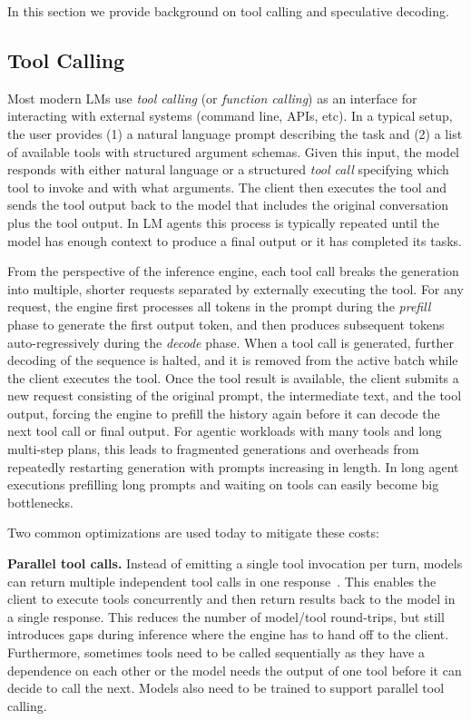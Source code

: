 


In this section we provide background on tool calling and speculative decoding.

\subsection{Tool Calling}\label{sec:bg-tool-calling}

Most modern LMs use \emph{tool calling} (or \emph{function calling}) as an interface for interacting with external systems (command line, APIs, etc).
In a typical setup, the user provides (1) a natural language prompt describing the task and (2) a list of available tools with structured argument schemas.
Given this input, the model responds with either natural language or a structured \emph{tool call} specifying which tool to invoke and with what arguments.
The client then executes the tool and sends the tool output back to the model that includes the original conversation plus the tool output.
In LM agents this process is typically repeated until the model has enough context to produce a final output or it has completed its tasks.

From the perspective of the inference engine, each tool call breaks the generation into multiple, shorter requests separated by externally executing the tool. For any request, the engine first processes all tokens in the prompt during the \emph{prefill} phase to generate the first output token, and then produces subsequent tokens auto-regressively during the \emph{decode} phase. When a tool call is generated, further decoding of the sequence is halted, and it is removed from the active batch while the client executes the tool. Once the tool result is available, the client submits a new request consisting of the original prompt, the intermediate text, and the tool output, forcing the engine to prefill the history again before it can decode the next tool call or final output.
For agentic workloads with many tools and long multi-step plans, this leads to fragmented generations and overheads from repeatedly restarting generation with prompts increasing in length.
In long agent executions prefilling long prompts and waiting on tools can easily become big bottlenecks.

Two common optimizations are used today to mitigate these costs:

\vspace{0.08in}
\noindent \textbf{Parallel tool calls.}
    Instead of emitting a single tool invocation per turn, models can return multiple independent tool calls in one response~\cite{singh2024llm, chen2024facilitating}.
    This enables the client to execute tools concurrently and then return results back to the model in a single response.
    This reduces the number of model/tool round-trips, but still introduces gaps during inference where the engine has to hand off to the client.
    Furthermore, sometimes tools need to be called sequentially as they have a dependence on each other or the model needs the output of one tool before it can decide to call the next.
    Models also need to be trained to support parallel tool calling.

